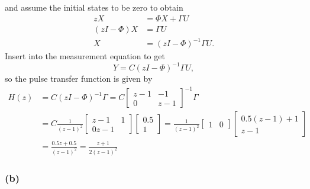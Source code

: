 \documentclass[letter,12pt]{article}
\newcommand{\bbm}{\begin{bmatrix}}
\newcommand{\ebm}{\end{bmatrix}}
\begin{document}
and assume the initial states to be zero to obtain
\begin{equation}
\begin{split}
zX &= \Phi X + \Gamma U\\
(zI - \Phi) X &= \Gamma U\\
X &= (zI-\Phi)^{-1}\Gamma U.
\end{split}
\end{equation}
Insert into the measurement equation to get
\[ Y = C(zI-\Phi)^{-1}\Gamma U,\]
so the pulse transfer function is given by
\begin{equation}
\begin{split}
H(z) &= C(zI-\Phi)^{-1}\Gamma = C \bbm z-1 & -1\\ 0 & z-1 \ebm^{-1}\Gamma\\
     &= C \frac{1}{(z-1)^2} \bbm z-1 & 1\\ 0 z-1 \ebm \bbm 0.5\\1\ebm 
      = \frac{1}{(z-1)^2} \bbm 1 & 0 \ebm  \bbm 0.5(z-1)+ 1\\ z-1 \ebm\\
     &= \frac{0.5z + 0.5}{(z-1)^2} = \frac{z+1}{2(z-1)^2}
   \end{split} 
 \end{equation}
 
\subsubsection*{(b)}
\end{document}
